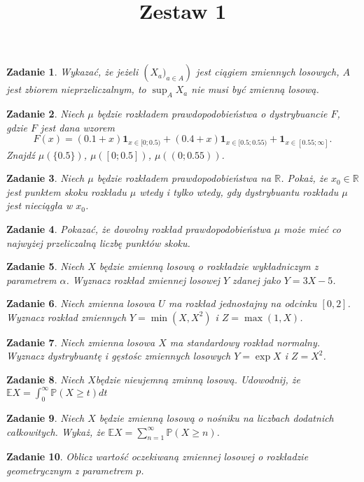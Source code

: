 \documentclass{mwart}
\title{Zestaw 1}
\newtheorem{zd}{Zadanie}
\begin{document}

\maketitle
\begin{zd}
Wykazać, że jeżeli $\left(X_a)_{a\in A}\right)$ jest ciągiem zmiennych losowych, $A$ jest zbiorem nieprzeliczalnym, to $\sup_AX_a$ nie musi być zmienną losową.
\end{zd}

\begin{zd}
Niech $\mu$ będzie rozkładem prawdopodobieństwa o dystrybuancie $F$, gdzie $F$ jest dana wzorem
\begin{displaymath}
F(x) = (0.1+x)\pmb{1}_{x\in[0; 0.5)} + (0.4+x)\pmb{1}_{x\in[0.5; 0.55)} + \pmb{1}_{x\in[0.55; \infty]}.
\end{displaymath}
Znajdź $\mu(\{0.5\})$, $\mu([0; 0.5])$, $\mu((0; 0.55))$.
\end{zd}

\begin{zd}
Niech $\mu$ będzie rozkładem prawdopodobieństwa na $\mathbb{R}$. Pokaż, że $x_0\in \mathbb{R}$ jest punktem skoku rozkładu $\mu$ wtedy i tylko wtedy, gdy dystrybuantu rozkładu $\mu$ jest nieciągła w $x_0$.
\end{zd}

\begin{zd}
Pokazać, że dowolny rozkład prawdopodobieństwa $\mu$ może mieć co najwyżej przeliczalną liczbę punktów skoku.
\end{zd}

\begin{zd}
Niech $X$ będzie zmienną losową o rozkładzie wykładniczym z parametrem $\alpha$. Wyznacz rozkład zmiennej losowej $Y$ zdanej jako $Y=3X-5$.
\end{zd}

\begin{zd}
Niech zmienna losowa $U$ ma rozkład jednostajny na odcinku $[0, 2]$. Wyznacz rozkład zmiennych $Y=\min(X, X^2)$ i $Z=\max(1, X)$.
\end{zd}

\begin{zd}
Niech zmienna losowa $X$ ma standardowy rozkład normalny. Wyznacz dystrybuantę i gęstośc zmiennych losowych $Y=\exp{X}$ i $Z=X^2$.
\end{zd}

\begin{zd}
Niech $X$będzie nieujemną zminną losową. Udowodnij, że $\mathbb{E}X = \int_{0}^{\infty}\mathbb{P}\left(X \geq t\right)dt$
\end{zd}

\begin{zd}
Niech $X$ będzie zmienną losową o nośniku na liczbach dodatnich całkowitych. Wykaż, że $\mathbb{E}X = \sum_{n=1}^{\infty}\mathbb{P}\left(X \geq n\right)$.
\end{zd}

\begin{zd}
Oblicz wartość oczekiwaną zmiennej losowej o rozkładzie geometrycznym z parametrem $p$.
\end{zd}
\end{document}

